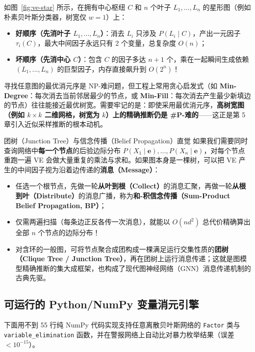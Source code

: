 如图~\ref{fig:ve-star} 所示，在拥有中心枢纽 $C$ 和 $n$ 个叶子 $L_1,\dots,L_n$ 的星形图（例如朴素贝叶斯分类器，树宽仅 $w=1$）上：
\begin{itemize}
  \item \textbf{好顺序（先消叶子 $L_1,\dots,L_n$）}：消去 $L_i$ 只涉及 $P(L_i\mid C)$，产出一元因子 $\tau_i(C)$，最大中间因子永远只有 2 个变量，总复杂度 $O(n)$；
  \item \textbf{坏顺序（先消中心 $C$）}：包含 $C$ 的因子多达 $n+1$ 个，乘在一起瞬间生成依赖 $(L_1,\dots,L_n)$ 的巨型因子，内存直接飙升到 $O(2^n)$！
\end{itemize}
寻找任意图的最优消元序是 NP-难问题，但工程上常用贪心启发式（如 \textbf{Min-Degree}：每次消去当前邻居最少的节点，或 \textbf{Min-Fill}：每次消去产生最少新填边的节点）往往能接近最优树宽。需要牢记的是：即使采用最优消元序，\textbf{高树宽图（例如 $k\times k$ 二维网格，树宽为 $k$）上的精确推断仍是 \#P-难的}——这正是第 5 章引入近似采样推断的根本动机。

\begin{extBox}{团树（Junction Tree）与信念传播（Belief Propagation）直觉}
如果我们需要同时查询网络中\textbf{每一个节点}的后验边际分布 $P(X_1\mid \mathbf{e}), \dots, P(X_n\mid \mathbf{e})$，对每个节点重跑一遍 VE 会做大量重复的乘法与求和。如果图本身是一棵树，可以把 VE 产生的中间因子视为沿着边传递的\textbf{消息（Message）}：
\begin{itemize}
  \item 任选一个根节点，先做一轮\textbf{从叶到根（Collect）}的消息汇聚，再做一轮\textbf{从根到叶（Distribute）}的消息广播，称为\textbf{和-积信念传播（Sum-Product Belief Propagation, BP）}；
  \item 仅需两遍扫描（每条边正反各传一次消息），就能以 $O(n d^2)$ 总代价精确算出全部 $n$ 个节点的边际分布！
  \item 对含环的一般图，可将节点聚合成团构成一棵满足运行交集性质的\textbf{团树（Clique Tree / Junction Tree）}，再在团树上运行消息传递；这就是图模型精确推断的集大成框架，也构成了现代图神经网络（GNN）消息传递机制的古典先驱。
\end{itemize}
\end{extBox}

\subsection{可运行的 Python/NumPy 变量消元引擎}

下面用不到 55 行纯 NumPy 代码实现支持任意离散贝叶斯网络的 \texttt{Factor} 类与 \texttt{variable\_elimination} 函数，并在警报网络上自动比对暴力枚举结果（误差 $< 10^{-15}$）。

